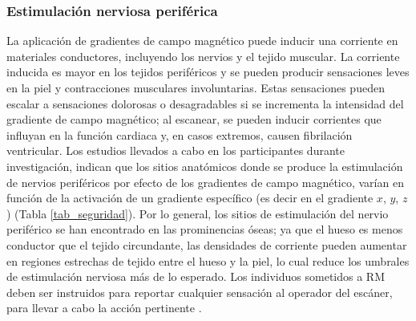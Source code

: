 \subsubsection{Estimulación nerviosa periférica}
La aplicación de gradientes de campo magnético puede inducir una corriente en materiales conductores, incluyendo los nervios y el tejido muscular. La corriente inducida es mayor en los tejidos periféricos y se pueden producir sensaciones leves en la piel y contracciones musculares involuntarias. Estas sensaciones pueden escalar a sensaciones dolorosas o desagradables si se incrementa la intensidad del gradiente de campo magnético; al escanear, se pueden inducir corrientes que influyan en la función cardiaca y, en casos extremos, causen fibrilación ventricular. Los estudios llevados a cabo en los participantes durante investigación, indican que los sitios anatómicos donde se produce la estimulación de nervios periféricos por efecto de los gradientes de campo magnético, varían en función de la activación de un gradiente específico (es decir en el gradiente $x$, $y$, $z$) (Tabla \ref{tab_seguridad}). Por lo general, los sitios de estimulación del nervio periférico se han encontrado en las prominencias óseas; ya que el hueso es menos conductor que el tejido circundante, las densidades de corriente pueden aumentar en regiones estrechas de tejido entre el hueso y la piel, lo cual reduce los umbrales de estimulación nerviosa más de lo esperado. Los individuos sometidos a RM deben ser instruidos para reportar cualquier sensación al operador del escáner, para llevar a cabo la acción pertinente \cite{Kangarlu_Robitaille_2000,HealthProtectionAgency_2008}. 


